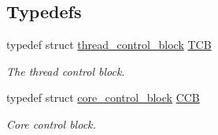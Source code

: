 \subsection*{Typedefs}
\begin{DoxyCompactItemize}
\item 
typedef struct \hyperlink{structthread__control__block}{thread\+\_\+control\+\_\+block} \hyperlink{group__scheduler_gaf88d9c946bf70b36a1e8bc34383abfc9}{T\+CB}
\begin{DoxyCompactList}\small\item\em The thread control block. \end{DoxyCompactList}\item 
typedef struct \hyperlink{structcore__control__block}{core\+\_\+control\+\_\+block} \hyperlink{group__scheduler_ga7485b31e0dd9fd723bc2d75fba5206a0}{C\+CB}
\begin{DoxyCompactList}\small\item\em Core control block. \end{DoxyCompactList}\end{DoxyCompactItemize}

